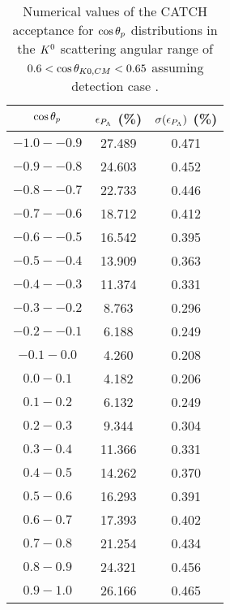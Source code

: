 \begin{table}[!h] 
  \begin{center}
  \caption{Numerical values of the CATCH acceptance for $\cos{\theta_p}$ distributions in the $K^{0}$ scattering angular range of \textbf{$0.6<\cos{\theta_{K0,CM}}<0.65$} assuming detection case .}
  \centering
  \begin{threeparttable}
    \begin{tabular}{ccc}
    $\cos{\theta_p}$ & $\epsilon_{P_{\Lambda}}$ (\%) & $\sigma(\epsilon_{P_{\Lambda}})$ (\%) \\
    \midrule\midrule
    $-1.0 - -0.9$ & 27.489 & 0.471 \\
    \midrule
    $-0.9 - -0.8$ & 24.603 & 0.452 \\
    \midrule
    $-0.8 - -0.7$ & 22.733 & 0.446 \\
    \midrule
    $-0.7 - -0.6$ & 18.712 & 0.412 \\
    \midrule
    $-0.6 - -0.5$ & 16.542 & 0.395 \\
    \midrule
    $-0.5 - -0.4$ & 13.909 & 0.363 \\
    \midrule
    $-0.4 - -0.3$ & 11.374 & 0.331 \\
    \midrule
    $-0.3 - -0.2$ & 8.763 & 0.296 \\
    \midrule
    $-0.2 - -0.1$ & 6.188 & 0.249 \\
    \midrule
    $-0.1 - 0.0$ & 4.260 & 0.208 \\
    \midrule
    $0.0 - 0.1$ & 4.182 & 0.206 \\
    \midrule
    $0.1 - 0.2$ & 6.132 & 0.249 \\
    \midrule
    $0.2 - 0.3$ & 9.344 & 0.304 \\
    \midrule
    $0.3 - 0.4$ & 11.366 & 0.331 \\
    \midrule
    $0.4 - 0.5$ & 14.262 & 0.370 \\
    \midrule
    $0.5 - 0.6$ & 16.293 & 0.391 \\
    \midrule
    $0.6 - 0.7$ & 17.393 & 0.402 \\
    \midrule
    $0.7 - 0.8$ & 21.254 & 0.434 \\
    \midrule
    $0.8 - 0.9$ & 24.321 & 0.456 \\
    \midrule
    $0.9 - 1.0$ & 26.166 & 0.465 \\
    \end{tabular}
  \end{threeparttable}
  \label{tab-Pl-acc_32}
  \end{center}
\end{table}

